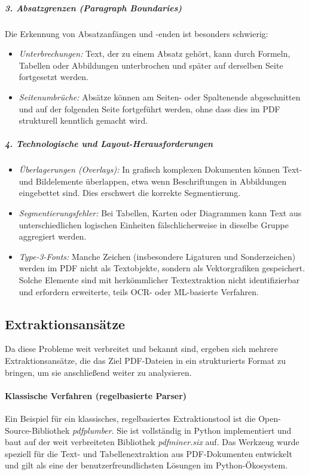 \subparagraph{3. Absatzgrenzen (Paragraph Boundaries)}
Die Erkennung von Absatzanfängen und -enden ist besonders schwierig:
\begin{itemize}
    \item \emph{Unterbrechungen:} Text, der zu einem Absatz gehört, kann durch Formeln, Tabellen oder Abbildungen unterbrochen und später auf derselben Seite 
    fortgesetzt werden.
    \item \emph{Seitenumbrüche:} Absätze können am Seiten- oder Spaltenende abgeschnitten und auf der folgenden Seite fortgeführt werden, ohne dass dies
    im PDF strukturell kenntlich gemacht wird.
\end{itemize}
\cite{Bast2017}

\subparagraph{4. Technologische und Layout-Herausforderungen}
\begin{itemize}
    \item \emph{Überlagerungen (Overlays):} 
    In grafisch komplexen Dokumenten können Text- und Bildelemente überlappen, etwa wenn Beschriftungen in Abbildungen eingebettet sind. 
    Dies erschwert die korrekte Segmentierung. \cite{Chao2004}
    \item \emph{Segmentierungsfehler:} 
    Bei Tabellen, Karten oder Diagrammen kann Text aus unterschiedlichen logischen Einheiten fälschlicherweise in dieselbe Gruppe aggregiert werden. \cite{Chao2004}
    \item \emph{Type-3-Fonts:} 
    Manche Zeichen (insbesondere Ligaturen und Sonderzeichen) werden im PDF nicht als Textobjekte, sondern als Vektorgrafiken gespeichert. 
    Solche Elemente sind mit herkömmlicher Textextraktion nicht identifizierbar und erfordern erweiterte, teils OCR- oder ML-basierte Verfahren. \cite{Bast2017}
\end{itemize}


\subsection{Extraktionsansätze}
Da diese Probleme weit verbreitet und bekannt sind, ergeben sich mehrere Extraktionsansätze, die das Ziel PDF-Dateien in ein strukturierts Format zu bringen,
um sie anschließend weiter zu analysieren. 

\paragraph{Klassische Verfahren (regelbasierte Parser)}
Ein Beispiel für ein klassisches, regelbasiertes Extraktionstool ist die Open-Source-Bibliothek \emph{pdfplumber}. 
Sie ist vollständig in Python implementiert und baut auf der weit verbreiteten Bibliothek \emph{pdfminer.six} auf. 
Das Werkzeug wurde speziell für die Text- und Tabellenextraktion aus PDF-Dokumenten entwickelt und gilt als eine 
der benutzerfreundlichsten Lösungen im Python-Ökosystem. \cite{Adhikari2025}

